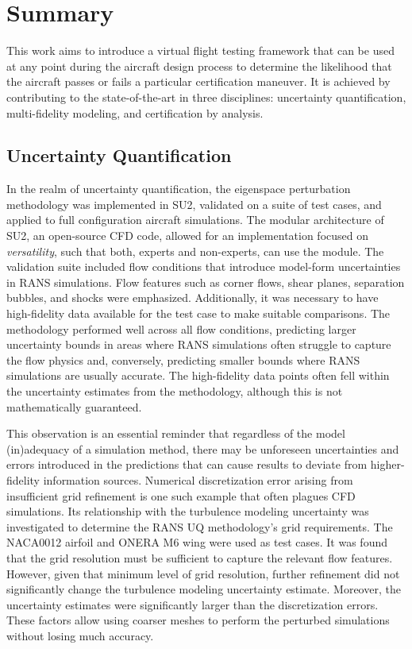 \section{Summary}
This work aims to introduce a virtual flight testing framework that can be used at any point during the aircraft design process to determine the likelihood that the aircraft passes or fails a particular certification maneuver. 
It is achieved by contributing to the state-of-the-art in three disciplines: uncertainty quantification, multi-fidelity modeling, and certification by analysis. 

\subsection{Uncertainty Quantification}

In the realm of uncertainty quantification, the eigenspace perturbation methodology \cite{iaccarino_eig_pert} was implemented in SU2, validated on a suite of test cases, and applied to full configuration aircraft simulations.
The modular architecture of SU2, an open-source CFD code, allowed for an implementation focused on \textit{versatility}, such that both, experts and non-experts, can use the module.
The validation suite included flow conditions that introduce model-form uncertainties in RANS simulations.
Flow features such as corner flows, shear planes, separation bubbles, and shocks were emphasized. 
Additionally, it was necessary to have high-fidelity data available for the test case to make suitable comparisons.
The methodology performed well across all flow conditions, predicting larger uncertainty bounds in areas where RANS simulations often struggle to capture the flow physics and, conversely, predicting smaller bounds where RANS simulations are usually accurate.
The high-fidelity data points often fell within the uncertainty estimates from the methodology, although this is not mathematically guaranteed. 

This observation is an essential reminder that regardless of the model (in)adequacy of a simulation method, there may be unforeseen uncertainties and errors introduced in the predictions that can cause results to deviate from higher-fidelity information sources. 
Numerical discretization error arising from insufficient grid refinement is one such example that often plagues CFD simulations. 
Its relationship with the turbulence modeling uncertainty was investigated to determine the RANS UQ methodology's grid requirements. The NACA0012 airfoil and ONERA M6 wing were used as test cases. 
It was found that the grid resolution must be sufficient to capture the relevant flow features.
However, given that minimum level of grid resolution,  further refinement did not significantly change the turbulence modeling uncertainty estimate.
Moreover, the uncertainty estimates were significantly larger than the discretization errors. 
These factors allow using coarser meshes to perform the perturbed simulations without losing much accuracy.


